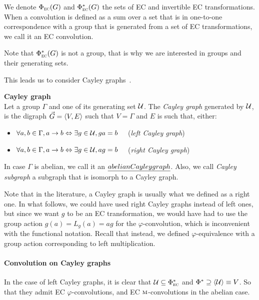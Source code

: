 We denote $\Phi_{\operatorname{\textsc{ec}}}(G)$ and $\Phi^*_{\operatorname{\textsc{ec}}}(G)$ the sets of EC and invertible EC transformations. When a convolution is defined as a sum over a set that is in one-to-one correspondence with a group that is generated from a set of EC transformations, we call it an EC convolution.

\begin{remark}
Note that $\Phi^*_{\operatorname{\textsc{ec}}}(G)$ is not a group, that is why we are interested in groups and their generating sets.
\end{remark}

This leads us to consider Cayley graphs~\citep{cayley1878desiderata}.%

\begin{definition}\textbf{Cayley graph}\\
Let a group $\Gamma$ and one of its generating set $\mathcal{U}$. The \emph{Cayley graph} generated by $\mathcal{U}$, is the digraph $\vec{G} = \langle V, E \rangle$ such that $V = \Gamma$ and $E$ is such that, either:
\begin{itemize}[nolistsep,noitemsep]
\item $\forall a,b \in \Gamma, a \rightarrow b \Leftrightarrow \exists g \in \mathcal{U}, ga = b \quad$ (\emph{left Cayley graph})
\item $\forall a,b \in \Gamma, a \rightarrow b \Leftrightarrow \exists g \in \mathcal{U}, ag = b \quad$ (\emph{right Cayley graph})
\end{itemize}
In case $\Gamma$ is abelian, we call it an $\emph{abelian Cayley graph}$. Also, we call \emph{Cayley subgraph} a subgraph that is isomorph to a Cayley graph.
\end{definition}

\begin{remark}
Note that in the literature, a Cayley graph is usually what we defined as a right one. In what follows, we could have used right Cayley graphs instead of left ones, but since we want $g$ to be an EC transformation, we would have had to use the group action $g(a) = L_g(a) = ag$ for the $\varphi$-convolution, which is inconvenient with the functional notation. Recall that instead, we defined $\varphi$-equivalence with a group action corresponding to left multiplication.
\end{remark}

\paragraph{Convolution on Cayley graphs}
In the case of left Cayley graphs, it is clear that $\mathcal{U} \subseteq \Phi^*_{\operatorname{\textsc{ec}}}$ and $\Phi^* \supseteq \langle \mathcal{U} \rangle \equiv V$. So that they admit EC $\varphi$-convolutions, and EC $\operatorname{\textsc{m}}$-convolutions in the abelian case.

